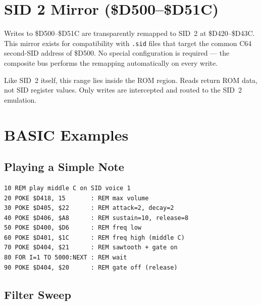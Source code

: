 \section{SID 2 Mirror (\$D500--\$D51C)}
\label{sec:sid2-mirror}


Writes to \$D500--\$D51C are transparently remapped to SID~2 at
\$D420--\$D43C.  This mirror exists for compatibility with \texttt{.sid} files
that target the common C64 second-SID address of \$D500.  No special
configuration is required --- the composite bus performs the remapping
automatically on every write.

\begin{notebox}
Like SID~2 itself, this range lies inside the ROM region.  Reads return ROM
data, not SID register values.  Only writes are intercepted and routed to the
SID~2 emulation.
\end{notebox}


\section{BASIC Examples}
\label{sec:sid-examples}

\subsection*{Playing a Simple Note}

\begin{lstlisting}
10 REM play middle C on SID voice 1
20 POKE $D418, 15       : REM max volume
30 POKE $D405, $22      : REM attack=2, decay=2
40 POKE $D406, $A8      : REM sustain=10, release=8
50 POKE $D400, $D6      : REM freq low
60 POKE $D401, $1C      : REM freq high (middle C)
70 POKE $D404, $21      : REM sawtooth + gate on
80 FOR I=1 TO 5000:NEXT : REM wait
90 POKE $D404, $20      : REM gate off (release)
\end{lstlisting}

\subsection*{Filter Sweep}

